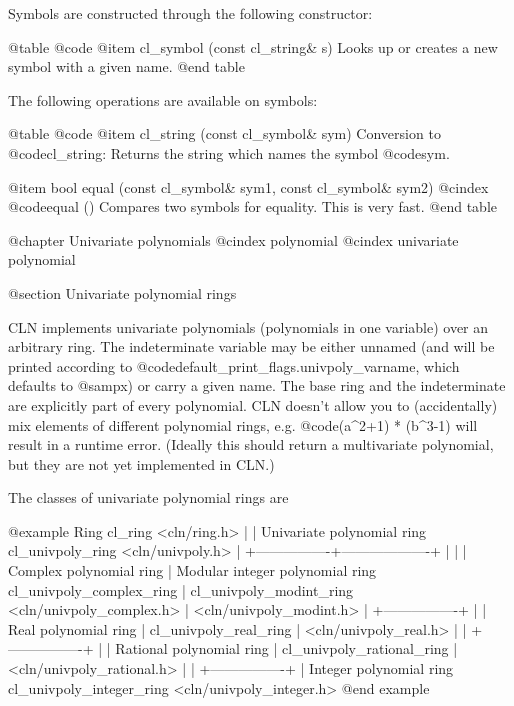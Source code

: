 Symbols are constructed through the following constructor:

@table @code
@item cl_symbol (const cl_string& s)
Looks up or creates a new symbol with a given name.
@end table

The following operations are available on symbols:

@table @code
@item cl_string (const cl_symbol& sym)
Conversion to @code{cl_string}: Returns the string which names the symbol
@code{sym}.

@item bool equal (const cl_symbol& sym1, const cl_symbol& sym2)
@cindex @code{equal ()}
Compares two symbols for equality. This is very fast.
@end table


@chapter Univariate polynomials
@cindex polynomial
@cindex univariate polynomial

@section Univariate polynomial rings

CLN implements univariate polynomials (polynomials in one variable) over an
arbitrary ring. The indeterminate variable may be either unnamed (and will be
printed according to @code{default_print_flags.univpoly_varname}, which
defaults to @samp{x}) or carry a given name. The base ring and the
indeterminate are explicitly part of every polynomial. CLN doesn't allow you to
(accidentally) mix elements of different polynomial rings, e.g.
@code{(a^2+1) * (b^3-1)} will result in a runtime error. (Ideally this should
return a multivariate polynomial, but they are not yet implemented in CLN.)

The classes of univariate polynomial rings are

@example
                           Ring
                         cl_ring
                       <cln/ring.h>
                            |
                            |
                 Univariate polynomial ring
                      cl_univpoly_ring
                      <cln/univpoly.h>
                            |
           +----------------+-------------------+
           |                |                   |
 Complex polynomial ring    |    Modular integer polynomial ring
 cl_univpoly_complex_ring   |        cl_univpoly_modint_ring
 <cln/univpoly_complex.h>   |        <cln/univpoly_modint.h>
                            |
           +----------------+
           |                |
   Real polynomial ring     |
   cl_univpoly_real_ring    |
   <cln/univpoly_real.h>    |
                            |
           +----------------+
           |                |
 Rational polynomial ring   |
 cl_univpoly_rational_ring  |
 <cln/univpoly_rational.h>  |
                            |
           +----------------+
           |
 Integer polynomial ring
 cl_univpoly_integer_ring
 <cln/univpoly_integer.h>
@end example

